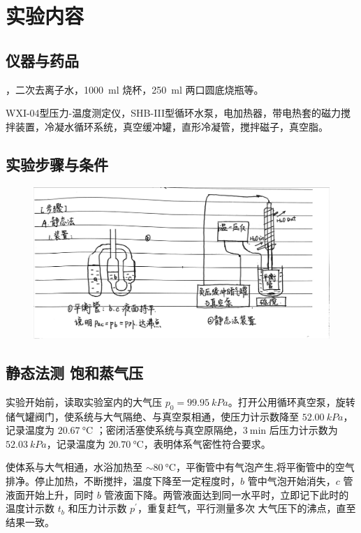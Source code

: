 \section{实验内容\cite{pcl2002}}

\subsection{仪器与药品}

，二次去离子水，\SI{1000}{\milli\litre} 烧杯，\SI{250}{\milli\litre} 两口圆底烧瓶等。

WXI-04型压力-温度测定仪，SHB-III型循环水泵，电加热器，带电热套的磁力搅拌装置，冷凝水循环系统，真空缓冲罐，直形冷凝管，搅拌磁子，真空脂。

\subsection{实验步骤与条件}

\begin{figure}[H]
   \centering
   \includegraphics[width=.78\textwidth]{figures/0-3-1.jpg}

\end{figure}

\subsection{静态法测  饱和蒸气压}
实验开始前，读取实验室内的大气压 \( p_0 = \SI{99.95}{kPa} \)。打开公用循环真空泵，旋转储气罐阀门，使系统与大气隔绝、与真空泵相通，使压力计示数降至 \( \SI{52.00}{kPa} \)，记录温度为 \(\SI{20.67}{\celsius} \) ；密闭活塞使系统与真空原隔绝，\( \SI{3}{\minute} \) 后压力计示数为 \( \SI{52.03}{kPa} \)，记录温度为 \(\SI{20.70}{\celsius} \)，表明体系气密性符合要求。

使体系与大气相通，水浴加热至 \( \sim \SI{80}{\celsius} \)，平衡管中有气泡产生,将平衡管中的空气排净。停止加热，不断搅拌，温度下降至一定程度时，\( b \) 管中气泡开始消失，\( c \) 管液面开始上升，同时 \( b \) 管液面下降。两管液面达到同一水平时，立即记下此时的温度计示数 \( t_b \) 和压力计示数 \( p^\prime \)，重复赶气，平行测量多次  大气压下的沸点，直至结果一致。

